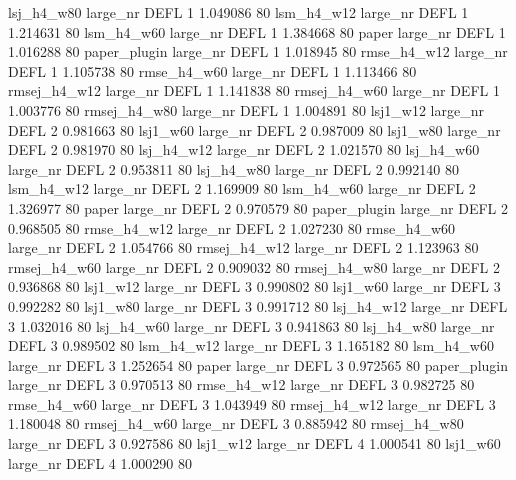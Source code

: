   lsj_h4_w80   large_nr     DEFL                 1 1.049086 80
  lsm_h4_w12   large_nr     DEFL                 1 1.214631 80
  lsm_h4_w60   large_nr     DEFL                 1 1.384668 80
       paper   large_nr     DEFL                 1 1.016288 80
paper_plugin   large_nr     DEFL                 1 1.018945 80
 rmse_h4_w12   large_nr     DEFL                 1 1.105738 80
 rmse_h4_w60   large_nr     DEFL                 1 1.113466 80
rmsej_h4_w12   large_nr     DEFL                 1 1.141838 80
rmsej_h4_w60   large_nr     DEFL                 1 1.003776 80
rmsej_h4_w80   large_nr     DEFL                 1 1.004891 80
    lsj1_w12   large_nr     DEFL                 2 0.981663 80
    lsj1_w60   large_nr     DEFL                 2 0.987009 80
    lsj1_w80   large_nr     DEFL                 2 0.981970 80
  lsj_h4_w12   large_nr     DEFL                 2 1.021570 80
  lsj_h4_w60   large_nr     DEFL                 2 0.953811 80
  lsj_h4_w80   large_nr     DEFL                 2 0.992140 80
  lsm_h4_w12   large_nr     DEFL                 2 1.169909 80
  lsm_h4_w60   large_nr     DEFL                 2 1.326977 80
       paper   large_nr     DEFL                 2 0.970579 80
paper_plugin   large_nr     DEFL                 2 0.968505 80
 rmse_h4_w12   large_nr     DEFL                 2 1.027230 80
 rmse_h4_w60   large_nr     DEFL                 2 1.054766 80
rmsej_h4_w12   large_nr     DEFL                 2 1.123963 80
rmsej_h4_w60   large_nr     DEFL                 2 0.909032 80
rmsej_h4_w80   large_nr     DEFL                 2 0.936868 80
    lsj1_w12   large_nr     DEFL                 3 0.990802 80
    lsj1_w60   large_nr     DEFL                 3 0.992282 80
    lsj1_w80   large_nr     DEFL                 3 0.991712 80
  lsj_h4_w12   large_nr     DEFL                 3 1.032016 80
  lsj_h4_w60   large_nr     DEFL                 3 0.941863 80
  lsj_h4_w80   large_nr     DEFL                 3 0.989502 80
  lsm_h4_w12   large_nr     DEFL                 3 1.165182 80
  lsm_h4_w60   large_nr     DEFL                 3 1.252654 80
       paper   large_nr     DEFL                 3 0.972565 80
paper_plugin   large_nr     DEFL                 3 0.970513 80
 rmse_h4_w12   large_nr     DEFL                 3 0.982725 80
 rmse_h4_w60   large_nr     DEFL                 3 1.043949 80
rmsej_h4_w12   large_nr     DEFL                 3 1.180048 80
rmsej_h4_w60   large_nr     DEFL                 3 0.885942 80
rmsej_h4_w80   large_nr     DEFL                 3 0.927586 80
    lsj1_w12   large_nr     DEFL                 4 1.000541 80
    lsj1_w60   large_nr     DEFL                 4 1.000290 80
